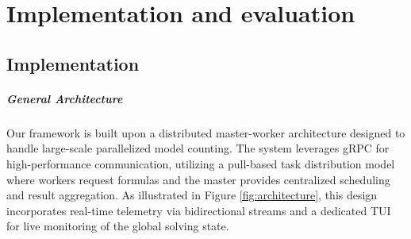 \documentclass{report}
\begin{document}
\chapter{Implementation and evaluation}
\section{Implementation}

\paragraph{General Architecture}
Our framework is built upon a distributed master-worker architecture designed to handle large-scale 
parallelized model counting. The system leverages gRPC for high-performance communication, 
utilizing a pull-based task distribution model where workers request formulas and 
the master provides centralized scheduling and result aggregation. As illustrated in Figure \ref{fig:architecture}, 
this design incorporates real-time telemetry via bidirectional streams and a dedicated TUI for live monitoring 
of the global solving state.
\end{document}
